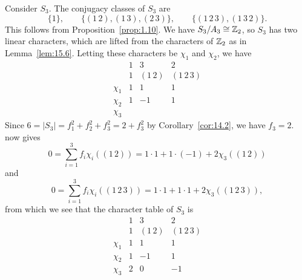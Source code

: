 \documentclass[../Odyssey_Project.tex]{subfiles}
\begin{document}
\begin{example}
\label{ex:15.eg.6}
Consider $S_3$. The conjugacy classes of $S_3$ are
\[
    \{1\}, \qquad
    \{(1\,2), (1\,3), (2\,3)\}, \qquad
    \{(1\,2\,3), (1\,3\,2)\}.
\]
This follows from Proposition~\ref{prop:1.10}. We have $S_3/A_3 \cong \mathbb{Z}_2$, so $S_3$ has two linear characters, which are lifted from the characters of $\mathbb{Z}_2$ as in Lemma~\ref{lem:15.6}. Letting these characters be $\chi_1$ and $\chi_2$, we have
\[
    \begin{array}{c|ccc}
        & 1 & 3 & 2 \\
        & 1 & (1\,2) & (1\,2\,3) \\
        \hline
        \chi_1 & 1 & 1 & 1 \\
        \chi_2 & 1 & -1 & 1 \\
        \chi_3 & & &
    \end{array}
\]
Since $6 = |S_3| = f_1^2 + f_2^2 + f_3^2 = 2 + f_3^2$ by Corollary~\ref{cor:14.2}, we have $f_3 = 2$.  now gives
\[
    0 = \sum_{i=1}^{3} f_i \chi_i((1\,2)) = 1 \cdot 1 + 1 \cdot (-1) + 2\chi_3((1\,2))
\]
and
\[
    0 = \sum_{i=1}^{3} f_i \chi_i((1\,2\,3)) = 1 \cdot 1 + 1 \cdot 1 + 2\chi_3((1\,2\,3)),
\]
from which we see that the character table of $S_3$ is
\[
    \begin{array}{c|ccc}
        & 1 & 3 & 2 \\
        & 1 & (1\,2) & (1\,2\,3) \\
        \hline
        \chi_1 & 1 & 1 & 1 \\
        \chi_2 & 1 & -1 & 1 \\
        \chi_3 & 2 & 0 & -1
    \end{array}
\]
\end{example}
\end{document}
